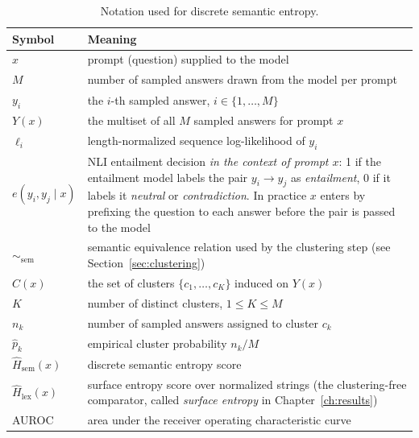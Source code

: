 \begin{table}[ht]
\centering
\caption{Notation used for discrete semantic entropy.}
\label{tab:notation}
\begin{tabular}{@{}lp{8.2cm}@{}}
\hline
\textbf{Symbol} & \textbf{Meaning} \\
\hline
$x$ & prompt (question) supplied to the model \\
$M$ & number of sampled answers drawn from the model per prompt \\
$y_i$ & the $i$-th sampled answer, $i \in \{1,\ldots,M\}$ \\
$Y(x)$ & the multiset of all $M$ sampled answers for prompt $x$ \\
$\ell_i$ & length-normalized sequence log-likelihood of $y_i$ \\
$e(y_i, y_j \mid x)$ & NLI entailment decision \emph{in the context of
                        prompt $x$}: 1 if the entailment model labels the pair
                        $y_i \to y_j$ as \emph{entailment}, 0 if it labels it
                        \emph{neutral} or \emph{contradiction}. In practice $x$
                        enters by prefixing the question to each answer before
                        the pair is passed to the model \\
$\sim_{\mathrm{sem}}$ & semantic equivalence relation used by the
                        clustering step (see Section~\ref{sec:clustering}) \\
$C(x)$ & the set of clusters $\{c_1,\ldots,c_K\}$ induced on $Y(x)$ \\
$K$ & number of distinct clusters, $1 \le K \le M$ \\
$n_k$ & number of sampled answers assigned to cluster $c_k$ \\
$\hat{p}_k$ & empirical cluster probability $n_k / M$ \\
$\widehat{H}_{\mathrm{sem}}(x)$ & discrete semantic entropy score \\
$\widehat{H}_{\mathrm{lex}}(x)$ & surface entropy score over normalized
                                  strings (the clustering-free comparator,
                                  called \emph{surface entropy} in
                                  Chapter~\ref{ch:results}) \\
AUROC & area under the receiver operating characteristic curve \\
\hline
\end{tabular}
\end{table}

